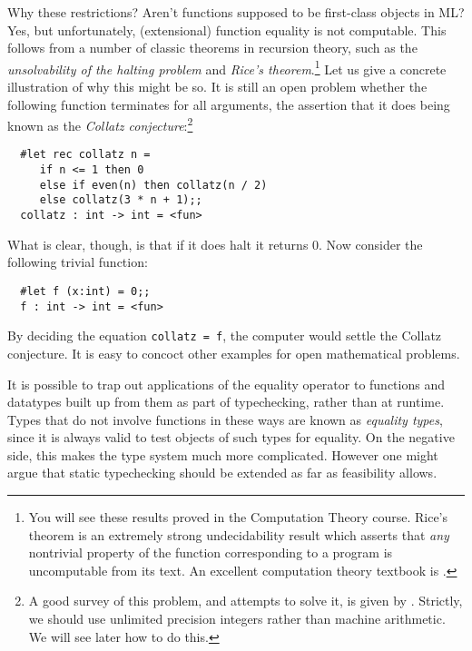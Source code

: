 Why these restrictions? Aren't functions supposed to be first-class objects in
ML? Yes, but unfortunately, (extensional) function equality is not computable.
This follows from a number of classic theorems in recursion theory, such as the
{\em unsolvability of the halting problem} and {\em Rice's
theorem}.\footnote{You will see these results proved in the Computation Theory
course. Rice's theorem is an extremely strong undecidability result which
asserts that {\em any} nontrivial property of the function corresponding to a
program is uncomputable from its text. An excellent computation theory textbook
is .} Let us give a concrete illustration of why this
might be so. It is still an open problem whether the following function
terminates for all arguments, the assertion that it does being known as the
{\em Collatz conjecture}:\footnote{A good survey of this problem, and attempts
to solve it, is given by . Strictly, we should use
unlimited precision integers rather than machine arithmetic. We will see later
how to do this.}

\begin{boxed}\begin{verbatim}
  #let rec collatz n =
     if n <= 1 then 0
     else if even(n) then collatz(n / 2)
     else collatz(3 * n + 1);;
  collatz : int -> int = <fun>
\end{verbatim}\end{boxed}

What is clear, though, is that if it does halt it returns $0$. Now consider the
following trivial function:

\begin{boxed}\begin{verbatim}
  #let f (x:int) = 0;;
  f : int -> int = <fun>
\end{verbatim}\end{boxed}

By deciding the equation {\tt collatz = f}, the computer would settle the
Collatz conjecture. It is easy to concoct other examples for open mathematical
problems.

It is possible to trap out applications of the equality operator to functions
and datatypes built up from them as part of typechecking, rather than at
runtime. Types that do not involve functions in these ways are known as {\em
equality types}, since it is always valid to test objects of such types for
equality. On the negative side, this makes the type system much more
complicated. However one might argue that static typechecking should be
extended as far as feasibility allows.

